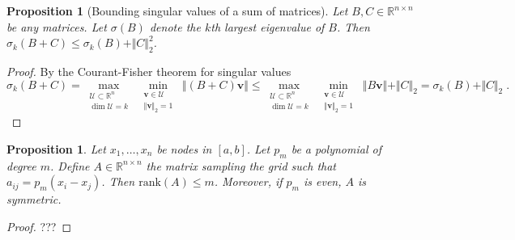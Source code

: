 \documentclass{article}
\newcommand{\vect}[1]{\boldsymbol{\mathbf{#1}}}
\newcommand{\R}{\mathbb R}
\newcommand{\norm}[1]{\Vert #1 \Vert}
\newtheorem{proposition}[theorem]{Proposition}
\begin{document}
\begin{proposition}[Bounding singular values of a sum of matrices] \label{thm:bound_singvals_sum_matrices}
Let $B, C \in \R^{n \times n}$ be any matrices. Let $\sigma(B)$ denote the $k$th largest eigenvalue of $B$. Then $\sigma_k(B + C) \le \sigma_k(B) + \norm{C}_2^2$.
\end{proposition}
\begin{proof}

By the Courant-Fisher theorem for singular values %
\begin{equation*}
    \sigma_k(B + C) = 
    \max_{\substack{\mathcal U \subset \R^n \\ \dim \mathcal U = k}} \;
    \min_{\substack{\vect v \in \mathcal U \\ \norm{\vect v}_2 = 1}} \; \norm{(B+C) \vect v} 
    \le \max_{\substack{\mathcal U \subset \R^n \\ \dim \mathcal U = k}} \;
    \min_{\substack{\vect v \in \mathcal U \\ \norm{\vect v}_2 = 1}} \; \norm{B \vect v} + \norm{C}_2
    = \sigma_k(B) + \norm{C}_2 \; .
\end{equation*}

\end{proof}

\begin{proposition} \label{thm:sampling_poly_rank}
Let $x_1, \ldots, x_n$ be nodes in $[a,b]$. Let $p_m$ be a polynomial of degree $m$. Define $A \in\R^{n\times n}$ the matrix sampling the grid such that $a_{ij} = p_m(x_i - x_j)$. Then $\text{rank}(A) \le m$. Moreover, if $p_m$ is even, $A$ is symmetric. 
\end{proposition}
\begin{proof}
???
\end{proof}
\end{document}
